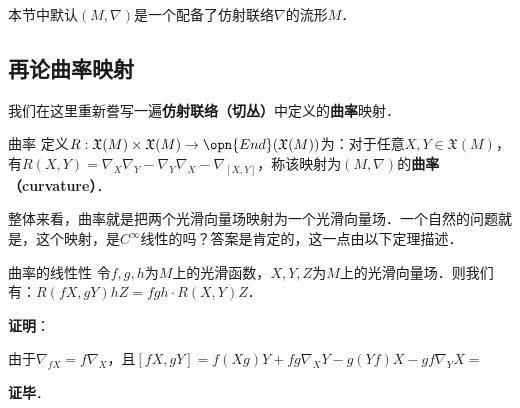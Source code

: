 

本节中默认$(M, \nabla)$是一个配备了仿射联络$\nabla$的流形$M$．

\subsection{再论曲率映射}

我们在这里重新誊写一遍\textbf{仿射联络（切丛）}中定义的\textbf{曲率}映射．

\begin{definition}{曲率}
定义$R:\mathfrak{X}(M)\times\mathfrak{X}(M)\to\opn{End}(\mathfrak{X}(M))$为：对于任意$X, Y\in\mathfrak{X}(M)$，有$R(X, Y)=\nabla_X\nabla_Y-\nabla_Y\nabla_X-\nabla_{[X, Y]}$，称该映射为$(M, \nabla)$的\textbf{曲率（curvature）}．
\end{definition}

整体来看，曲率就是把两个光滑向量场映射为一个光滑向量场．一个自然的问题就是，这个映射，是$C^{\infty}$线性的吗？答案是肯定的，这一点由以下定理描述．

\begin{theorem}{曲率的线性性}
令$f, g, h$为$M$上的光滑函数，$X, Y, Z$为$M$上的光滑向量场．则我们有：$R(fX, gY)hZ=fgh\cdot R(X, Y)Z$．
\end{theorem}

\textbf{证明}：

由于$\nabla_{fX}=f\nabla_X$，且$[fX, gY]=f(Xg)Y+fg\nabla_XY-g(Yf)X-gf\nabla_YX=$

\textbf{证毕}．

























